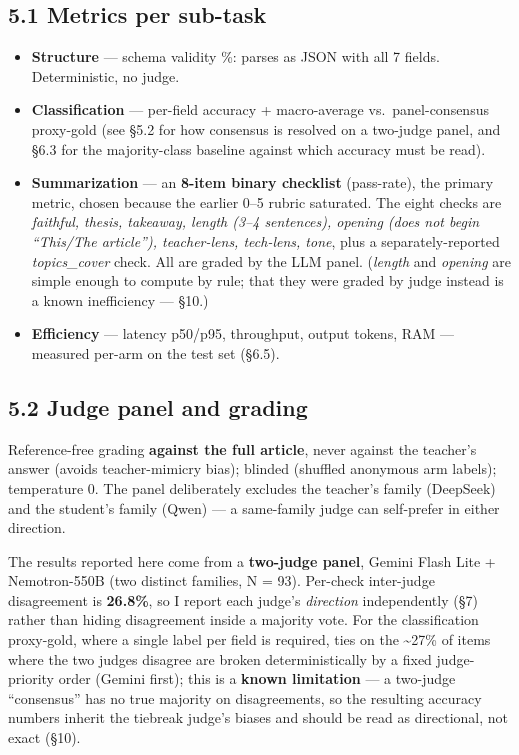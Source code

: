 \documentclass[11pt]{article}
\providecommand{\tightlist}{\setlength{\itemsep}{0pt}\setlength{\parskip}{0pt}}
\providecommand{\tightlist}{%
  \setlength{\itemsep}{0pt}\setlength{\parskip}{0pt}}
\begin{document}
\subsection{5.1 Metrics per sub-task}\label{metrics-per-sub-task}

\begin{itemize}
\tightlist
\item
  \textbf{Structure} --- schema validity \%: parses as JSON with all 7
  fields. Deterministic, no judge.
\item
  \textbf{Classification} --- per-field accuracy + macro-average
  vs.~panel-consensus proxy-gold (see §5.2 for how consensus is resolved
  on a two-judge panel, and §6.3 for the majority-class baseline against
  which accuracy must be read).
\item
  \textbf{Summarization} --- an \textbf{8-item binary checklist}
  (pass-rate), the primary metric, chosen because the earlier 0--5
  rubric saturated. The eight checks are \emph{faithful, thesis,
  takeaway, length (3--4 sentences), opening (does not begin ``This/The
  article''), teacher-lens, tech-lens, tone}, plus a separately-reported
  \emph{topics\_cover} check. All are graded by the LLM panel.
  (\emph{length} and \emph{opening} are simple enough to compute by
  rule; that they were graded by judge instead is a known inefficiency
  --- §10.)
\item
  \textbf{Efficiency} --- latency p50/p95, throughput, output tokens,
  RAM --- measured per-arm on the test set (§6.5).
\end{itemize}

\subsection{5.2 Judge panel and grading}\label{judge-panel-and-grading}

Reference-free grading \textbf{against the full article}, never against
the teacher's answer (avoids teacher-mimicry bias); blinded (shuffled
anonymous arm labels); temperature 0. The panel deliberately excludes
the teacher's family (DeepSeek) and the student's family (Qwen) --- a
same-family judge can self-prefer in either direction.

The results reported here come from a \textbf{two-judge panel}, Gemini
Flash Lite + Nemotron-550B (two distinct families, N = 93). Per-check
inter-judge disagreement is \textbf{26.8\%}, so I report each judge's
\emph{direction} independently (§7) rather than hiding disagreement
inside a majority vote. For the classification proxy-gold, where a
single label per field is required, ties on the \textasciitilde27\% of
items where the two judges disagree are broken deterministically by a
fixed judge-priority order (Gemini first); this is a \textbf{known
limitation} --- a two-judge ``consensus'' has no true majority on
disagreements, so the resulting accuracy numbers inherit the tiebreak
judge's biases and should be read as directional, not exact (§10).
\end{document}
